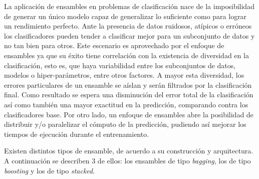 La aplicación de ensambles en problemas de clasificación nace de la
imposibilidad de generar un único modelo capaz de generalizar lo suficiente como
para lograr un rendimiento perfecto. Ante la presencia de datos ruidosos,
atípicos o erróneos los clasificadores pueden tender a clasificar mejor para un
subconjunto de datos y no tan bien para otros. Este escenario es aprovechado por
el enfoque de ensambles ya que su éxito tiene correlación con la existencia de
diversidad en la clasificación, esto es, que haya variabilidad entre los
subconjuntos de datos, modelos o hiper-parámetros, entre otros factores. A mayor
esta diversidad, los errores particulares de un ensamble se aíslan y serán
filtrados por la clasificación final. Como resultado se espera una disminución
del error total de la clasificación así como también una mayor exactitud en la
predicción, comparando contra los clasificadores base. Por otro lado, un enfoque
de ensambles abre la posibilidad de distribuir y/o paralelizar el cómputo de la
predicción, pudiendo así mejorar los tiempos de ejecución durante el
entrenamiento.

Existen distintos tipos de ensamble, de acuerdo a su construcción y
arquitectura. A continuación se describen 3 de ellos: los ensambles de tipo
\textit{bagging}, los de tipo \textit{boosting} y los de tipo \textit{stacked}. 

